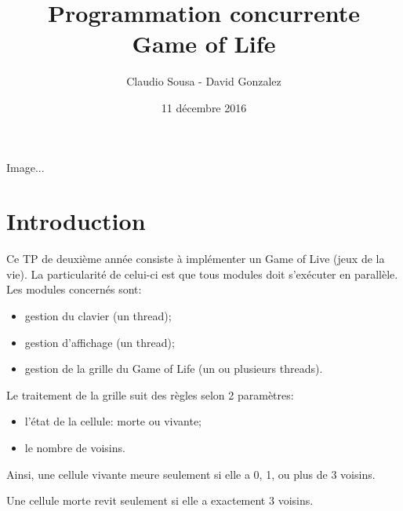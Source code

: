 \documentclass[11pt, a4paper]{article}
\begin{document}
\title
{
    \Huge{Programmation concurrente} \\
    \Huge{Game of Life}
}
\author
{
    \LARGE{Claudio Sousa - David Gonzalez}
}
\date{11 décembre 2016}
\maketitle

\begin{center}
    Image...%
\end{center}

\thispagestyle{empty}

\newpage

\section{Introduction}

Ce TP de deuxième année consiste à implémenter un Game of Live (jeux de la vie).
La particularité de celui-ci est que tous modules doit s'exécuter en parallèle. \\

Les modules concernés sont:

\begin{itemize}
    \item gestion du clavier (un thread);
    \item gestion d'affichage (un thread);
    \item gestion de la grille du Game of Life (un ou plusieurs threads). \\
\end{itemize}

Le traitement de la grille suit des règles selon 2 paramètres:

\begin{itemize}
    \item l'état de la cellule: morte ou vivante;
    \item le nombre de voisins. \\
\end{itemize}

Ainsi, une cellule vivante meure seulement si elle a 0, 1, ou plus de 3 voisins.

Une cellule morte revit seulement si elle a exactement 3 voisins.

\newpage

\end{document}
